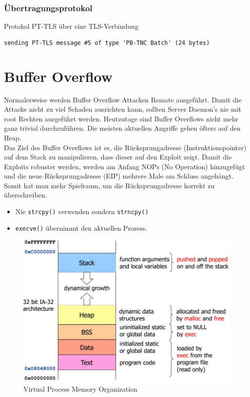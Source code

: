 \subsubsection{Übertragungsprotokol}
Protokol PT-TLS über eine TLS-Verbindung
\begin{lstlisting}
sending PT-TLS message #5 of type 'PB-TNC Batch' (24 bytes)
\end{lstlisting}

\section{Buffer Overflow}
Normalerweise werden Buffer Overflow Attacken Remote ausgeführt. Damit die Attacke nicht zu viel Schaden ausrichten kann, sollten Server Daemon's nie mit root Rechten ausgeführt werden. Heutzutage sind Buffer Overflows nicht mehr ganz trivial durchzuführen. Die meisten aktuellen Angriffe gehen öfters auf den Heap. \\


Das Ziel des Buffer Overflows ist es, die Rücksprungadresse (Instruktionspointer) auf dem Stack zu manipulieren, dass dieser auf den Exploit zeigt. Damit die Exploits robuster werden, werden am Anfang NOPs (No Operation) hinzugefügt und die neue Rücksprungadresse (EIP) mehrere Male am Schluss angehängt. Somit hat man mehr Spielraum, um die Rücksprungadresse korrekt zu überschreiben.

\begin{itemize}
	\item Nie \lstinline|strcpy()| verwenden sondern \lstinline|strncpy()|
	\item \lstinline|execve()| übernimmt den aktuellen Prozess.
\end{itemize}

\begin{figure}[h]
\centering
\includegraphics[width=0.7\linewidth]{images/memory_organization}
\caption{Virtual Process Memory Organization}
\label{fig:memoryorganization}
\end{figure}

